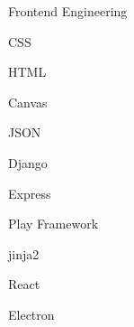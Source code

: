\begin{skillset}{Frontend Engineering}
  \item CSS
  \item HTML
  \item Canvas
  \item JSON
  \item Django
  \item Express
  \item Play Framework
  \item jinja2
  \item React
  \item Electron
\end{skillset}
